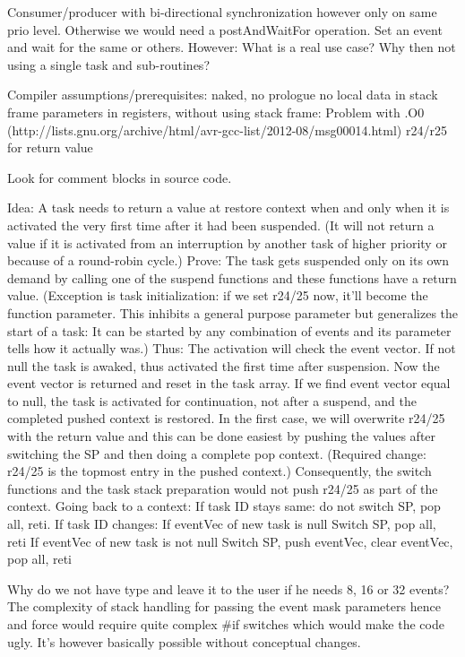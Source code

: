 Consumer/producer with bi-directional synchronization however only on same
prio level. Otherwise we would need a postAndWaitFor operation. Set an
event and wait for the same or others. However: What is a real use case?
Why then not using a single task and sub-routines?

Compiler assumptions/prerequisites:
  naked, no prologue
  no local data in stack frame
  parameters in registers, without using stack frame: Problem with .O0 (http://lists.gnu.org/archive/html/avr-gcc-list/2012-08/msg00014.html)
  r24/r25 for return value 

Look for comment blocks in source code.

    Idea: A task needs to return a value at restore context when and only when it is
    activated the very first time after it had been suspended. (It will not return a value
    if it is activated from an interruption by another task of higher priority or because
    of a round-robin cycle.) Prove: The
    task gets suspended only on its own demand by calling one of the suspend functions
    and these functions have a return value. (Exception is task initialization: if we set
    r24/25 now, it'll become the function parameter. This inhibits a general purpose
    parameter but generalizes the start of a task: It can be started by any combination of
    events and its parameter tells how it actually was.)
      Thus: The activation will check the event vector. If not null the task is awaked,
    thus activated the first time after suspension. Now the event vector is returned and
    reset in the task array. If we find event vector equal to null, the task is activated
    for continuation, not after a suspend, and the completed pushed context is restored.
      In the first case, we will overwrite r24/25 with the return value and this can be
    done easiest by pushing the values after switching the SP and then doing a complete pop
    context. (Required change: r24/25 is the topmost entry in the pushed context.)
    Consequently, the switch functions and the task stack preparation would not push r24/25
    as part of the context.
      Going back to a context:
    If task ID stays same: do not switch SP, pop all, reti.
    If task ID changes:
        If eventVec of new task is null
            Switch SP, pop all, reti
        If eventVec of new task is not null
            Switch SP, push eventVec, clear eventVec, pop all, reti

Why do we not have type  and leave it to the user if he needs
8, 16 or 32 events? The complexity of stack handling for passing the event
mask parameters hence and force would require quite complex \#if switches
which would make the code ugly. It's however basically possible without
conceptual changes.

